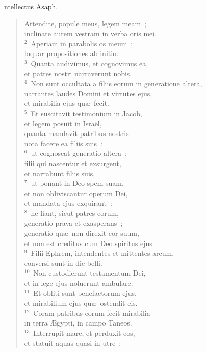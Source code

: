 \bchapter[Psalm]
ntellectus Asaph. \begin{verse}Attendite, popule meus, legem meam~;\\ inclinate aurem vestram in verba oris mei.\\
${}^{2}$~Aperiam in parabolis os meum~;\\ loquar propositiones ab initio.\\
${}^{3}$~Quanta audivimus, et cognovimus ea,\\ et patres nostri narraverunt nobis.\\
${}^{4}$~Non sunt occultata a filiis eorum in generatione altera,\\ narrantes laudes Domini et virtutes ejus,\\ et mirabilia ejus qu\ae\ fecit.\\
${}^{5}$~Et suscitavit testimonium in Jacob,\\ et legem posuit in Isra\"el,\\ quanta mandavit patribus nostris\\ nota facere ea filiis suis~:\\
${}^{6}$~ut cognoscat generatio altera~:\\ filii qui nascentur et exsurgent,\\ et narrabunt filiis suis,\\
${}^{7}$~ut ponant in Deo spem suam,\\ et non obliviscantur operum Dei,\\ et mandata ejus exquirant~:\\
${}^{8}$~ne fiant, sicut patres eorum,\\ generatio prava et exasperans~;\\ generatio qu\ae\ non direxit cor suum,\\ et non est creditus cum Deo spiritus ejus.\\
${}^{9}$~Filii Ephrem, intendentes et mittentes arcum,\\ conversi sunt in die belli.\\
${}^{10}$~Non custodierunt testamentum Dei,\\ et in lege ejus noluerunt ambulare.\\
${}^{11}$~Et obliti sunt benefactorum ejus,\\ et mirabilium ejus qu\ae\ ostendit eis.\\
${}^{12}$~Coram patribus eorum fecit mirabilia\\ in terra \AE gypti, in campo Taneos.\\
${}^{13}$~Interrupit mare, et perduxit eos,\\ et statuit aquas quasi in utre~:\\

\end{verse}
